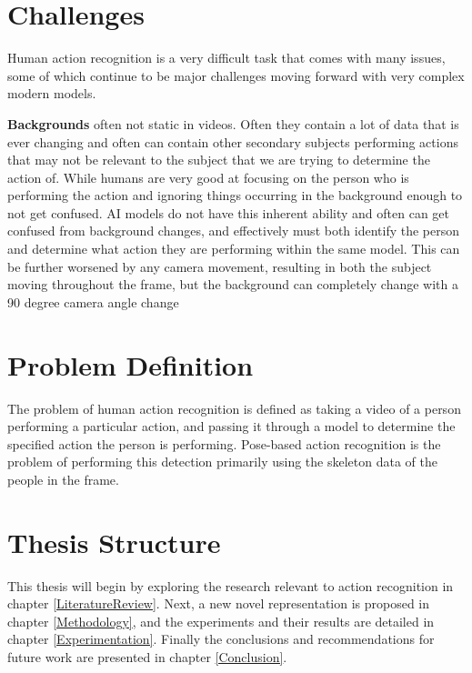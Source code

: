 \section{Challenges}
\label{sec:challenges}

Human action recognition is a very difficult task that comes with many issues, some of which continue to be major challenges moving forward with very complex modern models.

\textbf{Backgrounds} often not static in videos. Often they contain a lot of data that is ever changing and often can contain other secondary subjects performing actions that may not be relevant to the subject that we are trying to determine the action of. While humans are very good at focusing on the person who is performing the action and ignoring things occurring in the background enough to not get confused. AI models do not have this inherent ability and often can get confused from background changes, and effectively must both identify the person and determine what action they are performing within the same model. This can be further worsened by any camera movement, resulting in both the subject moving throughout the frame, but the background can completely change with a  90 degree camera angle change

\section{Problem Definition}

The problem of human action recognition is defined as taking a video of a person performing a particular action, and passing it through a model to determine the specified action the person is performing. Pose-based action recognition is the problem of performing this detection primarily using the skeleton data of the people in the frame.

\section{Thesis Structure}

This thesis will begin by exploring the research relevant to action recognition in chapter \ref{LiteratureReview}. Next, a new novel representation is proposed in chapter \ref{Methodology}, and the experiments and their results are detailed in chapter \ref{Experimentation}. Finally the conclusions and recommendations for future work are presented in chapter \ref{Conclusion}.